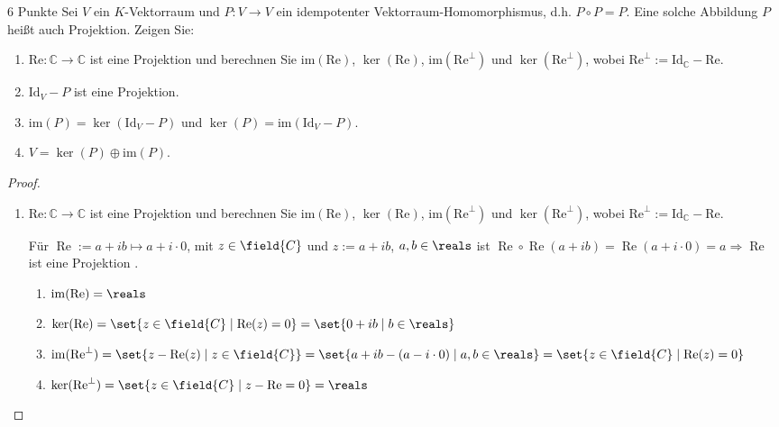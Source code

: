 \documentclass{../problemset}
\begin{document}
\begin{problem}[Projektionen]{6 Punkte}
Sei $V$ ein $K$-Vektorraum und $P : V \to V$ ein idempotenter Vektorraum-Homomorphismus, d.h.
$P \circ P = P$. Eine solche Abbildung $P$ heißt auch Projektion. Zeigen Sie:
\begin{enumerate}
	\item $\text{Re} : \mathbb{C} \to \mathbb{C}$ ist eine Projektion und berechnen Sie $\text{im}(\text{Re})$, $\ker(\text{Re})$, $\text{im}(\text{Re}^\perp)$ und $\ker(\text{Re}^\perp)$, wobei $\text{Re}^\perp := \text{Id}_\mathbb{C} - \text{Re}$.
	\item $\text{Id}_V - P$ ist eine Projektion.
	\item $\text{im}(P) = \ker(\text{Id}_V - P)$ und $\ker(P) = \text{im}(\text{Id}_V - P)$.
	\item $V = \ker(P) \oplus \text{im}(P)$.
\end{enumerate}

\begin{proof}
	$ $

	\begin{enumerate}
		\item $\text{Re} : \mathbb{C} \to \mathbb{C}$ ist eine Projektion und berechnen Sie $\text{im}(\text{Re})$, $\ker(\text{Re})$, $\text{im}(\text{Re}^\perp)$ und $\ker(\text{Re}^\perp)$, wobei $\text{Re}^\perp := \text{Id}_\mathbb{C} - \text{Re}$.

		      Für $\operatorname{Re} := a + ib \mapsto a + i \cdot 0$, mit $z \in \field{C}$ und $z := a + ib$, $a,b \in \reals$ ist $
			      \operatorname{Re} \circ \operatorname{Re} (a + ib) = \operatorname{Re}(a + i \cdot 0) = a \Rightarrow \operatorname{Re}$ ist eine
		      Projektion \checkmark.

              \begin{enumerate}
                \item $\operatorname{im}(\operatorname{Re}) = \reals$ \checkmark
                \item $\ker(\operatorname{Re}) = \set{z \in \field{C} \mid \operatorname{Re}(z) = 0} = \set{0 + ib \mid b \in \reals}$ \checkmark
                \item $\operatorname{im}(\operatorname{Re}^\perp) = \set{ z - \operatorname{Re}(z) \mid z \in \field{C}} = \set { a + ib - (a - i \cdot 0) \mid a,b \in \reals} = \set{ z \in \field{C} \mid \operatorname{Re}(z) = 0}$ \checkmark
                \item $\operatorname{ker}(\operatorname{Re}^\perp) = \set{ z \in \field{C} \mid z - \operatorname{Re} = 0} = \reals $ \checkmark


\end{enumerate}
\end{enumerate}
\end{proof}
\end{problem}
\end{document}
